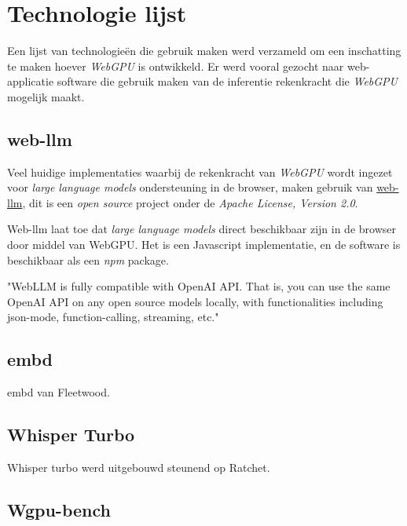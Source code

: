 \chapter{Technologie lijst}
\label{ch:technologylist}

Een lijst van technologieën die gebruik maken werd verzameld om een inschatting te maken hoever \textit{WebGPU} is ontwikkeld. Er werd vooral gezocht naar web-applicatie software die gebruik maken van de inferentie rekenkracht die \textit{WebGPU} mogelijk maakt.

\section{web-llm}

Veel huidige implementaties waarbij de rekenkracht van \textit{WebGPU} wordt ingezet voor \textit{large language models} ondersteuning in de browser, maken gebruik van \href{https://github.com/mlc-ai/web-llm}{web-llm}, dit is een \textit{open source} project onder de \textit{Apache License, Version 2.0}.

\bigbreak{}

Web-llm laat toe dat \textit{large language models} direct beschikbaar zijn in de browser door middel van WebGPU. Het is een Javascript implementatie, en de software is beschikbaar als een \textit{npm} package.

\begin{displayquote}
    "WebLLM is fully compatible with OpenAI API. That is, you can use the same OpenAI API on any open source models locally, with functionalities including json-mode, function-calling, streaming, etc."
\end{displayquote}

\section{embd}

embd van Fleetwood. \autocite{Fleetwood2023c}

\section{Whisper Turbo}

Whisper turbo werd uitgebouwd steunend op Ratchet. \autocite{Fleetwood2023b}

\section{Wgpu-bench}

